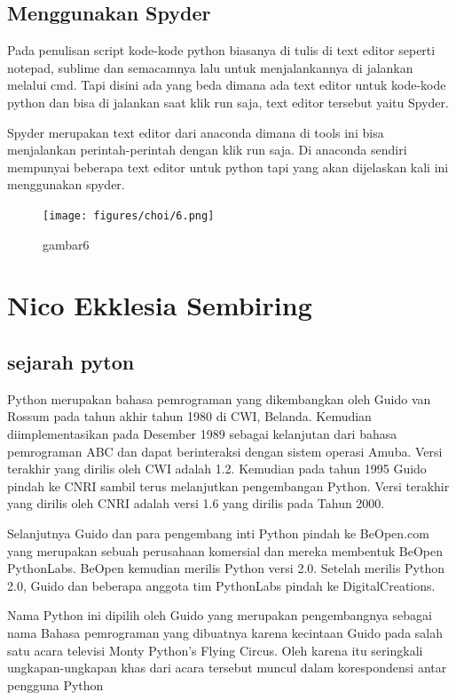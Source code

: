 \subsection{Menggunakan Spyder}
Pada penulisan script kode-kode python biasanya di tulis di text editor seperti notepad, sublime dan semacamnya lalu untuk menjalankannya di jalankan melalui cmd. Tapi disini ada yang beda dimana ada text editor untuk kode-kode python dan bisa di jalankan saat klik run saja, text editor tersebut yaitu Spyder.
\par Spyder merupakan text editor dari anaconda dimana di tools ini bisa menjalankan perintah-perintah dengan klik run saja. Di anaconda sendiri mempunyai beberapa text editor untuk python tapi yang akan dijelaskan kali ini menggunakan spyder.
\begin{figure}[!htbp]
    \centering
    \texttt{[image: figures/choi/6.png]}
    \caption{gambar6}
    \label{spyder}
    \end{figure}
	



\section{Nico Ekklesia Sembiring}
\subsection{sejarah pyton}
Python merupakan bahasa pemrograman yang dikembangkan oleh Guido van Rossum pada tahun akhir tahun 1980 di CWI, Belanda. Kemudian diimplementasikan pada Desember 1989 sebagai kelanjutan dari bahasa pemrograman ABC dan dapat berinteraksi dengan sistem operasi Amuba. Versi terakhir yang dirilis oleh CWI adalah 1.2. Kemudian pada tahun 1995 Guido pindah ke CNRI sambil terus melanjutkan pengembangan Python. Versi terakhir yang dirilis oleh CNRI adalah versi 1.6 yang dirilis pada Tahun 2000. 

Selanjutnya Guido dan para pengembang inti Python pindah ke BeOpen.com yang merupakan sebuah perusahaan komersial dan mereka membentuk BeOpen PythonLabs. BeOpen kemudian merilis Python versi 2.0. Setelah merilis Python 2.0, Guido dan beberapa anggota tim PythonLabs pindah ke DigitalCreations. 

Nama Python ini dipilih oleh Guido yang merupakan pengembangnya sebagai nama Bahasa pemrograman yang dibuatnya karena kecintaan Guido pada salah satu acara televisi Monty Python’s Flying Circus. Oleh karena itu seringkali ungkapan-ungkapan khas dari acara tersebut muncul dalam korespondensi antar pengguna Python

